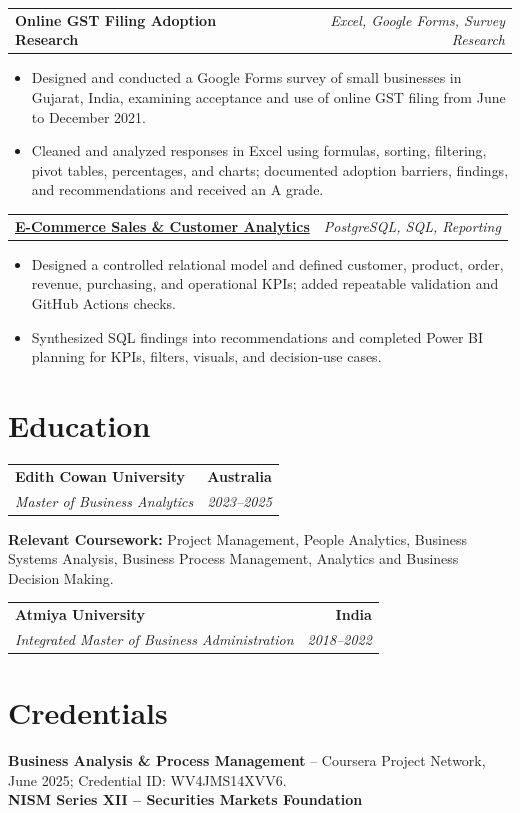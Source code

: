 \documentclass[letterpaper,10pt]{article}
\makeatletter
\newcommand{\role}[4]{%
  \begin{tabularx}{\textwidth}{@{}Xr@{}}
    \textbf{#1} & \textbf{#2} \\
    \textit{#3} & \textit{#4}
  \end{tabularx}\vspace{-1pt}
}
\newcommand{\project}[2]{%
  \begin{tabularx}{\textwidth}{@{}Xr@{}}
    \textbf{#1} & \textit{#2}
  \end{tabularx}\vspace{-1pt}
}
\makeatother
\begin{document}
\project{Online GST Filing Adoption Research}{Excel, Google Forms, Survey Research}
\begin{itemize}
  \item Designed and conducted a Google Forms survey of small businesses in Gujarat, India, examining acceptance and use of online GST filing from June to December 2021.
  \item Cleaned and analyzed responses in Excel using formulas, sorting, filtering, pivot tables, percentages, and charts; documented adoption barriers, findings, and recommendations and received an A grade.
\end{itemize}
\vspace{1pt}

\project{\href{https://github.com/jainalimehta/Ecommerce-Sales-Analytics}{E-Commerce Sales \& Customer Analytics}}{PostgreSQL, SQL, Reporting}
\begin{itemize}
  \item Designed a controlled relational model and defined customer, product, order, revenue, purchasing, and operational KPIs; added repeatable validation and GitHub Actions checks.
  \item Synthesized SQL findings into recommendations and completed Power BI planning for KPIs, filters, visuals, and decision-use cases.
\end{itemize}

\section{Education}
\role{Edith Cowan University}{Australia}{Master of Business Analytics}{2023--2025}
\small\textbf{Relevant Coursework:} Project Management, People Analytics, Business Systems Analysis, Business Process Management, Analytics and Business Decision Making.\\[2pt]
\role{Atmiya University}{India}{Integrated Master of Business Administration}{2018--2022}

\section{Credentials}
\small\textbf{Business Analysis \& Process Management} -- Coursera Project Network, June 2025; Credential ID: WV4JMS14XVV6.\\[-0.2pt]
\small\textbf{NISM Series XII -- Securities Markets Foundation}
\end{document}
